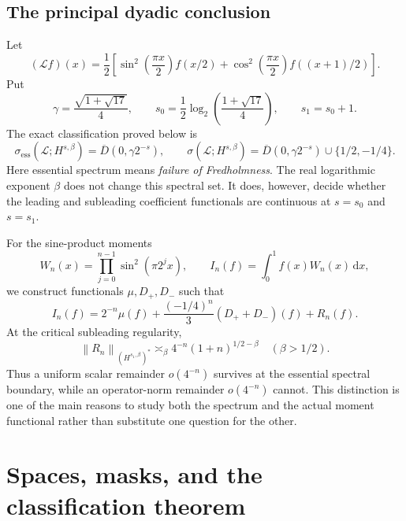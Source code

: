 \documentclass[11pt,a4paper]{article}
\theoremstyle{definition}
\theoremstyle{remark}
\newcommand{\dd}{\,\mathrm d}
\newcommand{\Lop}{\mathcal L}
\newcommand{\ess}{\mathrm{ess}}
\newcommand{\norm}[1]{\left\lVert#1\right\rVert}
\newcommand{\Disk}[1]{\overline{D}(0,#1)}
\numberwithin{equation}{section}
\begin{document}
\subsection{The principal dyadic conclusion}
Let
\begin{equation}
 (\Lop f)(x)=\frac12\left[
 \sin^2\!\left(\frac{\pi x}{2}\right)f(x/2)
 +\cos^2\!\left(\frac{\pi x}{2}\right)f((x+1)/2)\right].
 \label{eq:intro-L}
\end{equation}
Put
\begin{equation}
 \gamma=\frac{\sqrt{1+\sqrt{17}}}{4},\qquad
 s_0=\frac12\log_2\!\left(\frac{1+\sqrt{17}}4\right),\qquad
 s_1=s_0+1.
 \label{eq:thresholds-intro}
\end{equation}
The exact classification proved below is
\begin{equation}
 \sigma_{\ess}(\Lop;H^{s,\beta})=\Disk{\gamma2^{-s}},\qquad
 \sigma(\Lop;H^{s,\beta})=
 \Disk{\gamma2^{-s}}\cup\{1/2,-1/4\}.
 \label{eq:intro-spectrum}
\end{equation}
Here essential spectrum means \emph{failure of Fredholmness}. The real
logarithmic exponent $\beta$ does not change this spectral set. It does,
however, decide whether the leading and subleading coefficient functionals
are continuous at $s=s_0$ and $s=s_1$.

For the sine-product moments
\begin{equation}
 W_n(x)=\prod_{j=0}^{n-1}\sin^2(\pi2^j x),\qquad
 I_n(f)=\int_0^1 f(x)W_n(x)\dd x,
 \label{eq:intro-moments}
\end{equation}
we construct functionals $\mu,D_+,D_-$ such that
\begin{equation}
 I_n(f)=2^{-n}\mu(f)
  +\frac{(-1/4)^n}{3}(D_++D_-)(f)+R_n(f).
 \label{eq:intro-two-term}
\end{equation}
At the critical subleading regularity,
\begin{equation}
 \norm{R_n}_{(H^{s_1,\beta})^*}
 \asymp_\beta 4^{-n}(1+n)^{1/2-\beta}
 \quad(\beta>1/2).
 \label{eq:intro-endpoint}
\end{equation}
Thus a uniform scalar remainder $o(4^{-n})$ survives at the essential
spectral boundary, while an operator-norm remainder $o(4^{-n})$ cannot.
This distinction is one of the main reasons to study both the spectrum and
the actual moment functional rather than substitute one question for the other.

\section{Spaces, masks, and the classification theorem}
\label{sec:framework}
\end{document}
